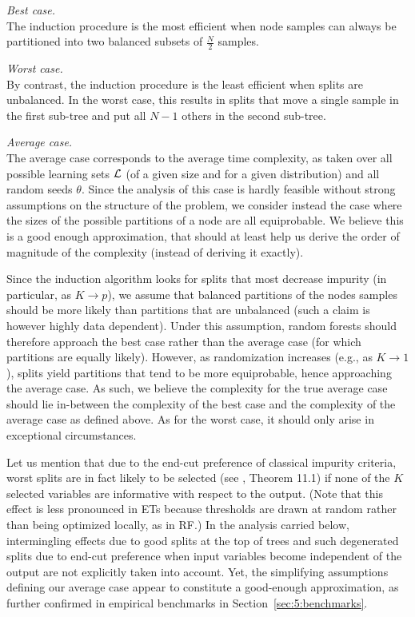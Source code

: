 \begin{description}
\item \textit{Best case.}\hfill\\
      The induction procedure is the most efficient
      when node samples can always be partitioned into two balanced subsets of $\tfrac{N}{2}$
      samples.

\item \textit{Worst case.}\hfill\\
      By contrast, the induction procedure is the least
      efficient when splits are unbalanced. In the worst case,
      this results in splits that move a single sample in the first sub-tree and
      put all $N-1$ others in the second sub-tree.

\item \textit{Average case.}\hfill\\
      The average case corresponds to the average time
      complexity, as taken over all possible learning sets ${\cal L}$ (of a given size and for a given distribution) and
      all random seeds $\theta$.  Since the analysis of this case is hardly
      feasible without strong assumptions on the structure of the problem,
      we consider instead the case where the sizes of the possible
      partitions of a node are all equiprobable. We believe this is a good
      enough approximation, that should at least help us derive the order
      of magnitude of the complexity (instead of deriving it exactly).

\end{description}

Since the induction algorithm looks for splits that most decrease impurity (in
particular, as $K\to p$), we assume that balanced partitions of the nodes
samples should  be more likely than partitions that are unbalanced (such a
claim is however highly data dependent). Under this assumption, random forests
should therefore approach the best case rather than the average case (for which
partitions are equally likely). However, as randomization increases (e.g., as $K
\to 1$), splits yield partitions that tend to be more equiprobable, hence
approaching the average case. As such, we believe the complexity for the true
average case should lie in-between the complexity of the best case and the
complexity of the average case as defined above. As for the worst case, it
should only arise in exceptional circumstances.

Let us mention that due to the end-cut preference of classical impurity
criteria, worst splits are in fact likely to be selected (see
\citep{breiman:1984}, Theorem 11.1) if none of the $K$ selected variables are
informative with respect to the output. (Note that this effect is
less pronounced in ETs because thresholds are drawn at random rather than being
optimized locally, as in RF.) In the analysis carried below,
intermingling effects  due to good splits at the top of trees and such degenerated
splits due to end-cut preference when input variables become independent of the
output are not explicitly taken into account. Yet, the simplifying assumptions
defining our average case appear to constitute a good-enough approximation,
as further confirmed in empirical benchmarks in Section~\ref{sec:5:benchmarks}.

